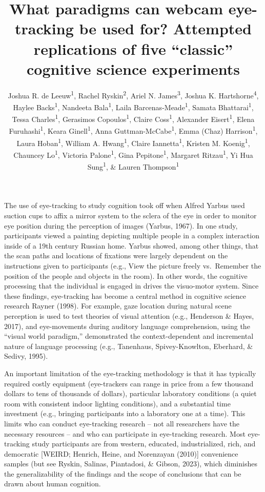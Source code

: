 \documentclass[
  man,floatsintext]{apa6}
\title{What paradigms can webcam eye-tracking be used for? Attempted replications of five ``classic'' cognitive science experiments}
\author{Joshua R. de Leeuw\textsuperscript{1}, Rachel Ryskin\textsuperscript{2}, Ariel N. James\textsuperscript{3}, Joshua K. Hartshorne\textsuperscript{4}, Haylee Backs\textsuperscript{1}, Nandeeta Bala\textsuperscript{1}, Laila Barcenas-Meade\textsuperscript{1}, Samata Bhattarai\textsuperscript{1}, Tessa Charles\textsuperscript{1}, Gerasimos Copoulos\textsuperscript{1}, Claire Coss\textsuperscript{1}, Alexander Eisert\textsuperscript{1}, Elena Furuhashi\textsuperscript{1}, Keara Ginell\textsuperscript{1}, Anna Guttman-McCabe\textsuperscript{1}, Emma (Chaz) Harrison\textsuperscript{1}, Laura Hoban\textsuperscript{1}, William A. Hwang\textsuperscript{1}, Claire Iannetta\textsuperscript{1}, Kristen M. Koenig\textsuperscript{1}, Chauncey Lo\textsuperscript{1}, Victoria Palone\textsuperscript{1}, Gina Pepitone\textsuperscript{1}, Margaret Ritzau\textsuperscript{1}, Yi Hua Sung\textsuperscript{1}, \& Lauren Thompson\textsuperscript{1}}
\date{}
\affiliation{\vspace{0.5cm}\textsuperscript{1} Cognitive Science Department, Vassar College\\\textsuperscript{2} Department of Cognitive \& Information Science, University of California, Merced\\\textsuperscript{3} Psychology Department, Macalester College\\\textsuperscript{4} Department of Psychology \& Neuroscience, Boston College}
\begin{document}
\maketitle

The use of eye-tracking to study cognition took off when Alfred Yarbus used suction cups to affix a mirror system to the sclera of the eye in order to monitor eye position during the perception of images (Yarbus, 1967). In one study, participants viewed a painting depicting multiple people in a complex interaction inside of a 19th century Russian home. Yarbus showed, among other things, that the scan paths and locations of fixations were largely dependent on the instructions given to participants (e.g., View the picture freely vs.~Remember the position of the people and objects in the room). In other words, the cognitive processing that the individual is engaged in drives the visuo-motor system. Since these findings, eye-tracking has become a central method in cognitive science research Rayner (1998). For example, gaze location during natural scene perception is used to test theories of visual attention (e.g., Henderson \& Hayes, 2017), and eye-movements during auditory language comprehension, using the ``visual world paradigm,'' demonstrated the context-dependent and incremental nature of language processing (e.g., Tanenhaus, Spivey-Knowlton, Eberhard, \& Sedivy, 1995).

An important limitation of the eye-tracking methodology is that it has typically required costly equipment (eye-trackers can range in price from a few thousand dollars to tens of thousands of dollars), particular laboratory conditions (a quiet room with consistent indoor lighting conditions), and a substantial time investment (e.g., bringing participants into a laboratory one at a time). This limits who can conduct eye-tracking research -- not all researchers have the necessary resources -- and who can participate in eye-tracking research. Most eye-tracking study participants are from western, educated, industrialized, rich, and democratic {[}WEIRD; Henrich, Heine, and Norenzayan (2010){]} convenience samples (but see Ryskin, Salinas, Piantadosi, \& Gibson, 2023), which diminishes the generalizability of the findings and the scope of conclusions that can be drawn about human cognition.
\end{document}
